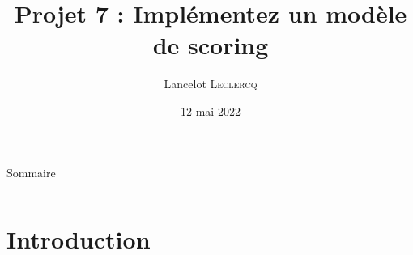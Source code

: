 \documentclass[8pt,aspectratio=169,hyperref={unicode=true}]{beamer}
\title[Implémentez un modèle de scoring]{Projet 7 : Implémentez un modèle de scoring}
\author[Lancelot \textsc{Leclercq}]{Lancelot \textsc{Leclercq}}
\institute[]{}
\date[]{\small{12 mai 2022}}
\begin{document}
\begin{frame}[plain]
    \titlepage
\end{frame}

\begin{frame}{Sommaire}
    \Large
    \begin{columns}
        \begin{column}{.7\textwidth}
            \tableofcontents[hideallsubsections]
        \end{column}
    \end{columns}
\end{frame}

\section{Introduction}
\end{document}
